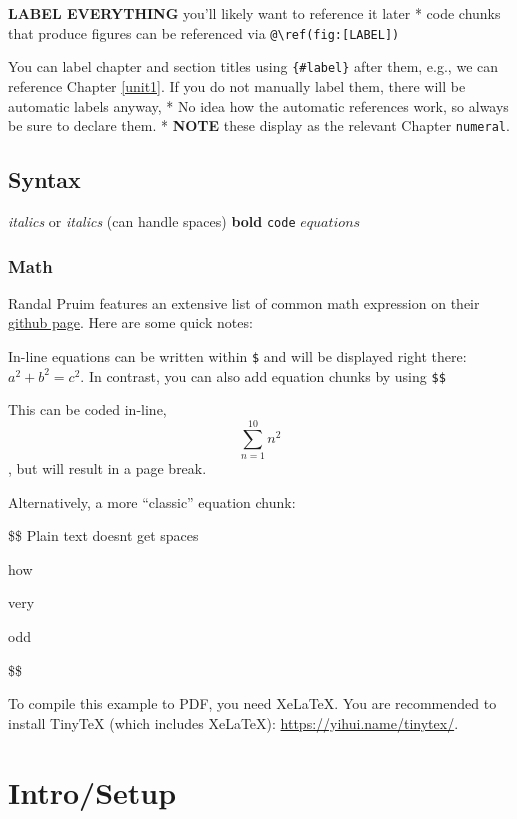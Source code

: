 \documentclass[
]{book}
\begin{document}
\textbf{LABEL EVERYTHING} you'll likely want to reference it later
* code chunks that produce figures can be referenced via \texttt{@\textbackslash{}ref(fig:{[}LABEL{]})}

You can label chapter and section titles using \texttt{\{\#label\}} after them, e.g., we can reference Chapter \ref{unit1}. If you do not manually label them, there will be automatic labels anyway,
* No idea how the automatic references work, so always be sure to declare them.
* \textbf{NOTE} these display as the relevant Chapter \texttt{numeral}.

\hypertarget{syntax}{%
\section{Syntax}\label{syntax}}

\emph{italics} or
\emph{italics} (can handle spaces)
\textbf{bold}
\texttt{code}
\(equations\)

\hypertarget{math}{%
\subsection{Math}\label{math}}

Randal Pruim features an extensive list of common math expression on their \href{https://rpruim.github.io/s341/S19/from-class/MathinRmd.html}{github page}. Here are some quick notes:

In-line equations can be written within \texttt{\$} and will be displayed right there: \(a^2 + b^2 = c^2\). In contrast, you can also add equation chunks by using \texttt{\$\$}

This can be coded in-line, \[\sum_{n=1}^{10} n^2\], but will result in a page break.

Alternatively, a more ``classic'' equation chunk:

\$\$
Plain text doesnt get spaces

how

very

odd

\$\$

To compile this example to PDF, you need XeLaTeX. You are recommended to install TinyTeX (which includes XeLaTeX): \url{https://yihui.name/tinytex/}.

\hypertarget{introsetup-1}{%
\chapter{Intro/Setup}\label{introsetup-1}}
\end{document}
